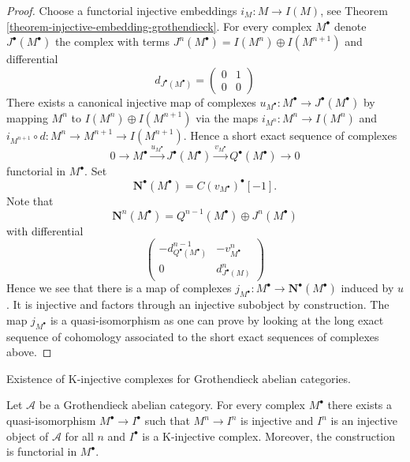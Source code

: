 \begin{proof}
Choose a functorial injective embeddings $i_M : M \to I(M)$, see
Theorem \ref{theorem-injective-embedding-grothendieck}.
For every complex $M^\bullet$ denote $J^\bullet(M^\bullet)$ the complex
with terms $J^n(M^\bullet) = I(M^n) \oplus I(M^{n + 1})$ and differential
$$
d_{J^\bullet(M^\bullet)} =
\left(
\begin{matrix}
0 & 1 \\
0 & 0
\end{matrix}
\right)
$$
There exists a canonical injective map of complexes
$u_{M^\bullet} : M^\bullet \to J^\bullet(M^\bullet)$ by mapping $M^n$ to
$I(M^n) \oplus I(M^{n + 1})$ via the maps $i_{M^n} : M^n \to I(M^n)$ and
$i_{M^{n + 1}} \circ d : M^n \to M^{n + 1} \to I(M^{n + 1})$. Hence a
short exact sequence of complexes
$$
0 \to M^\bullet \xrightarrow{u_{M^\bullet}}
J^\bullet(M^\bullet) \xrightarrow{v_{M^\bullet}}
Q^\bullet(M^\bullet) \to 0
$$
functorial in $M^\bullet$. Set
$$
\mathbf{N}^\bullet(M^\bullet) = C(v_{M^\bullet})^\bullet[-1].
$$
Note that
$$
\mathbf{N}^n(M^\bullet) = Q^{n - 1}(M^\bullet) \oplus J^n(M^\bullet)
$$
with differential
$$
\left(
\begin{matrix}
- d^{n - 1}_{Q^\bullet(M^\bullet)} & - v^n_{M^\bullet} \\
0 & d^n_{J^\bullet(M)}
\end{matrix}
\right)
$$
Hence we see that there is a map of complexes
$j_{M^\bullet} : M^\bullet \to \mathbf{N}^\bullet(M^\bullet)$
induced by $u$. It is injective and factors through an injective subobject
by construction. The map $j_{M^\bullet}$ is a quasi-isomorphism as one
can prove by looking at the long exact sequence of cohomology associated
to the short exact sequences of complexes above.
\end{proof}

\begin{theorem}
\label{theorem-K-injective-embedding-grothendieck}
\begin{slogan}
Existence of K-injective complexes for Grothendieck abelian categories.
\end{slogan}
Let $\mathcal{A}$ be a Grothendieck abelian category.
For every complex $M^\bullet$ there exists a quasi-isomorphism
$M^\bullet \to I^\bullet$ such that $M^n \to I^n$ is injective and $I^n$
is an injective object of $\mathcal{A}$ for all $n$ and $I^\bullet$
is a K-injective complex. Moreover, the construction is functorial in
$M^\bullet$.
\end{theorem}

